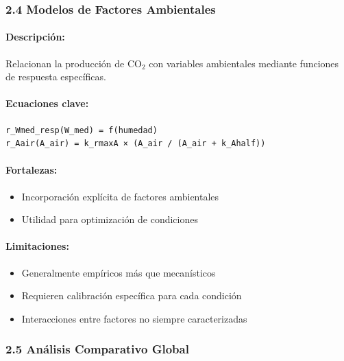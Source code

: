 \documentclass[
]{article}
\providecommand{\tightlist}{%
  \setlength{\itemsep}{0pt}\setlength{\parskip}{0pt}}
\begin{document}
\subsubsection{2.4 Modelos de Factores
Ambientales}\label{modelos-de-factores-ambientales}

\paragraph{Descripción:}\label{descripciuxf3n-3}

Relacionan la producción de CO$_2$ con variables ambientales mediante
funciones de respuesta específicas.

\paragraph{Ecuaciones clave:}\label{ecuaciones-clave-3}

\begin{verbatim}
r_Wmed_resp(W_med) = f(humedad)
r_Aair(A_air) = k_rmaxA × (A_air / (A_air + k_Ahalf))
\end{verbatim}

\paragraph{Fortalezas:}\label{fortalezas-3}

\begin{itemize}
\tightlist
\item
  Incorporación explícita de factores ambientales
\item
  Utilidad para optimización de condiciones
\end{itemize}

\paragraph{Limitaciones:}\label{limitaciones-3}

\begin{itemize}
\tightlist
\item
  Generalmente empíricos más que mecanísticos
\item
  Requieren calibración específica para cada condición
\item
  Interacciones entre factores no siempre caracterizadas
\end{itemize}

\subsubsection{2.5 Análisis Comparativo
Global}\label{anuxe1lisis-comparativo-global}
\end{document}
